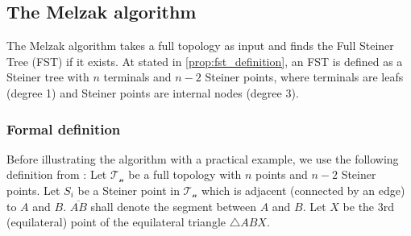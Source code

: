 \documentclass{l4proj}
\begin{document}
\subsection{The Melzak algorithm}
\label{sec:melzak_algo}
The Melzak algorithm takes a full topology as input and finds the Full Steiner Tree (FST) if it exists. At stated in \ref{prop:fst_definition}, an FST is defined as a Steiner tree with $n$ terminals and $n-2$ Steiner points, where terminals are leafs (degree 1) and Steiner points are internal nodes (degree 3).

\subsubsection{Formal definition}
Before illustrating the algorithm with a practical example, we use the following definition from \citep{Brazil2015}:
Let $\mathcal{T_n}$ be a full topology with $n$ points and $n - 2$ Steiner points. Let $S_i$ be a Steiner point in $\mathcal{T_n}$ which is adjacent (connected by an edge) to $A$ and $B$. $\overline{AB}$ shall denote the segment between $A$ and $B$. Let $X$ be the 3rd (equilateral) point of the equilateral triangle $\triangle ABX$.
\end{document}
